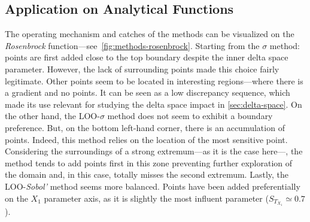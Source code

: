 \subsection{Application on Analytical Functions}
\label{sec:res-functions}

The operating mechanism and catches of the methods can be visualized on the \textit{Rosenbrock} function---see~\cref{fig:methods-rosenbrock}. Starting from the $\sigma$ method: points are first added close to the top boundary despite the inner delta space parameter. However, the lack of surrounding points made this choice fairly legitimate. Other points seem to be located in interesting regions---where there is a gradient and no points. It can be seen as a low discrepancy sequence, which made its use relevant for studying the delta space impact in \cref{sec:delta-space}. On the other hand, the LOO-$\sigma$ method does not seem to exhibit a boundary preference. But, on the bottom left-hand corner, there is an accumulation of points. Indeed, this method relies on the location of the most sensitive point. Considering the surroundings of a strong extremum---as it is the case here---, the method tends to add points first in this zone preventing further exploration of the domain and, in this case, totally misses the second extremum. Lastly, the LOO-\textit{Sobol'} method seems more balanced. Points have been added preferentially on the $X_1$ parameter axis, as it is slightly the most influent parameter ($S_{T_{X_1}} \simeq 0.7$). 

